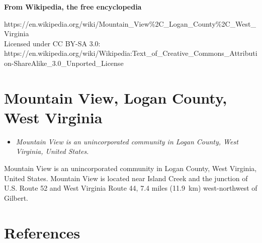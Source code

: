 \textbf{From Wikipedia, the free encyclopedia}

https://en.wikipedia.org/wiki/Mountain\_View\%2C\_Logan\_County\%2C\_West\_Virginia\\
Licensed under CC BY-SA 3.0:\\
https://en.wikipedia.org/wiki/Wikipedia:Text\_of\_Creative\_Commons\_Attribution-ShareAlike\_3.0\_Unported\_License

\section{Mountain View, Logan County, West
Virginia}\label{mountain-view-logan-county-west-virginia}

\begin{itemize}
\item
  \emph{Mountain View is an unincorporated community in Logan County,
  West Virginia, United States.}
\end{itemize}

Mountain View is an unincorporated community in Logan County, West
Virginia, United States. Mountain View is located near Island Creek and
the junction of U.S. Route 52 and West Virginia Route 44, 7.4 miles
(11.9~km) west-northwest of Gilbert.

\section{References}\label{references}
